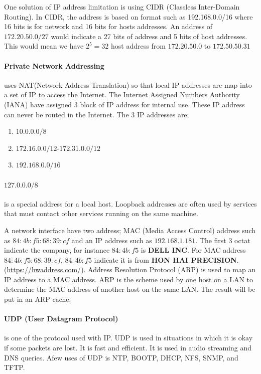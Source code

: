 \documentclass[7x9]{times}
\begin{document}
One solution of IP address limitation is using CIDR 
(Classless Inter-Domain Routing). In CIDR, the address is 
based on format such as 192.168.0.0/16 where 16 bits is for 
network and 16 bits for hosts addresses. An address of 
$172.20.50.0/27$ would indicate a 27 bits of address and 5 
bits of host addresses. This would mean we have $2^5=32$ 
host address from $172.20.50.0$ to $172.50.50.31$

\paragraph{Private Network Addressing} uses NAT(Network
Address Translation) so that local IP addresses are map into
a set of IP to access the Internet. The Internet Assigned
Numbers Authority (IANA) have assigned 3 block of IP 
address for internal use. These IP address can never be 
routed in the Internet. The 3 IP addresses are;
\begin{enumerate}
    \item $10.0.0.0/8$
    \item $172.16.0.0/12$-$172.31.0.0/12$
    \item $192.168.0.0/16$
\end{enumerate}

\paragraph{$127.0.0.0/8$} is a special address for a local
host. Loopback addresses are often used by services that
must contact other services running on the same machine. 

A network interface have two address; MAC (Media Access
Control) address such as $84:4b:f5:68:39:cf$ and an IP
address such as $192.168.1.181$. The first 3 octat indicate
the company, for instance $84:4b:f5$ is \textbf{DELL INC}.
For MAC address $84:4b:f5:68:39:cf$, $84:4b:f5$ indicate it
is from \textbf{HON HAI PRECISION}.
(\url{https://hwaddress.com/}). Address Resolution Protocol
(ARP) is used to map an IP address to a MAC address. ARP is
the scheme used by one host on a LAN to determine the MAC
address of another host on the same LAN\@. The result will be
put in an ARP cache.


\paragraph{UDP (User Datagram Protocol)} is one of the 
protocol used with IP\@. UDP is used in situations in which 
it is okay if some packets are lost. It is fast and 
efficient. It is used in audio streaming and DNS queries. 
Afew uses of UDP is NTP, BOOTP, DHCP, NFS, SNMP, and TFTP\@. 
\end{document}
